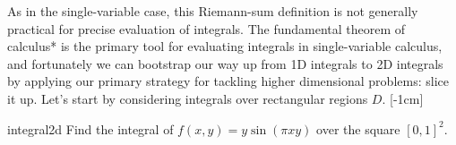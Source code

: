 \documentclass[svgnames]{watsonbook}
\begin{document}
  As in the single-variable case, this Riemann-sum definition is not
  generally practical for precise evaluation of integrals. The
  fundamental theorem of calculus* is the primary tool for evaluating
  integrals in single-variable calculus, and fortunately we can
  bootstrap our way up from 1D integrals to 2D integrals by applying
  our primary strategy for tackling higher dimensional problems: slice
  it up. Let's start by considering integrals over rectangular regions
  $D$. [-1cm]

  \begin{example}{}{integral2d}
    Find the integral of $f(x,y) = y \sin(\pi x y)$ over the square $[0,1]^2$. 
  \end{example}
\end{document}
